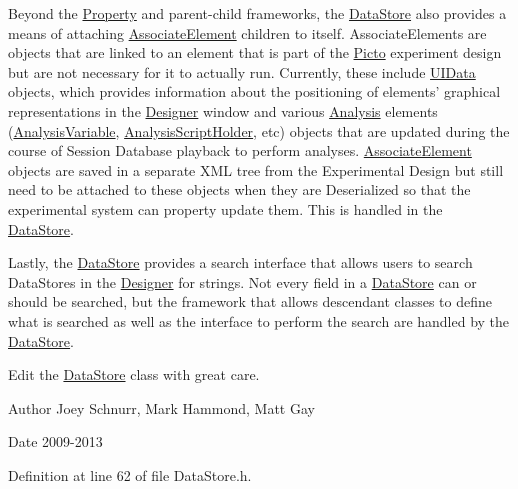 Beyond the \hyperlink{class_picto_1_1_property}{Property} and parent-\/child frameworks, the \hyperlink{class_picto_1_1_data_store}{Data\-Store} also provides a means of attaching \hyperlink{class_picto_1_1_associate_element}{Associate\-Element} children to itself. Associate\-Elements are objects that are linked to an element that is part of the \hyperlink{namespace_picto}{Picto} experiment design but are not necessary for it to actually run. Currently, these include \hyperlink{class_picto_1_1_u_i_data}{U\-I\-Data} objects, which provides information about the positioning of elements' graphical representations in the \hyperlink{class_designer}{Designer} window and various \hyperlink{class_picto_1_1_analysis}{Analysis} elements (\hyperlink{class_picto_1_1_analysis_variable}{Analysis\-Variable}, \hyperlink{class_picto_1_1_analysis_script_holder}{Analysis\-Script\-Holder}, etc) objects that are updated during the course of Session Database playback to perform analyses. \hyperlink{class_picto_1_1_associate_element}{Associate\-Element} objects are saved in a separate X\-M\-L tree from the Experimental Design but still need to be attached to these objects when they are Deserialized so that the experimental system can property update them. This is handled in the \hyperlink{class_picto_1_1_data_store}{Data\-Store}.

Lastly, the \hyperlink{class_picto_1_1_data_store}{Data\-Store} provides a search interface that allows users to search Data\-Stores in the \hyperlink{class_designer}{Designer} for strings. Not every field in a \hyperlink{class_picto_1_1_data_store}{Data\-Store} can or should be searched, but the framework that allows descendant classes to define what is searched as well as the interface to perform the search are handled by the \hyperlink{class_picto_1_1_data_store}{Data\-Store}.

Edit the \hyperlink{class_picto_1_1_data_store}{Data\-Store} class with great care. \begin{DoxyAuthor}{Author}
Joey Schnurr, Mark Hammond, Matt Gay 
\end{DoxyAuthor}
\begin{DoxyDate}{Date}
2009-\/2013 
\end{DoxyDate}


Definition at line 62 of file Data\-Store.\-h.



